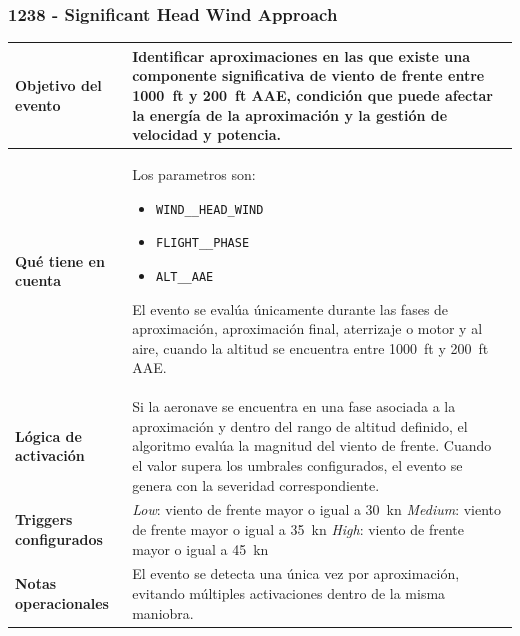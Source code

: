 \documentclass[11pt,a4paper]{article}
\begin{document}
	\subsubsection{1238 - Significant Head Wind Approach}
	\begin{table}[H]
		\centering
		\renewcommand{\arraystretch}{1.3}
		\begin{tabular}{p{5cm} p{9.5cm}}
			\hline
			\textbf{Objetivo del evento} &
			Identificar aproximaciones en las que existe una componente significativa de viento de frente entre \SI{1000}{ft} y \SI{200}{ft} AAE, condición que puede afectar la energía de la aproximación y la gestión de velocidad y potencia. \\
			\hline
			\textbf{Qué tiene en cuenta} & Los parametros son:
			\begin{itemize}
				\item \texttt{WIND\_\_HEAD\_WIND}
				\item \texttt{FLIGHT\_\_PHASE}
				\item \texttt{ALT\_\_AAE}
			\end{itemize}
			El evento se evalúa únicamente durante las fases de aproximación, aproximación final, aterrizaje o motor y al aire, cuando la altitud se encuentra entre \SI{1000}{ft} y \SI{200}{ft} AAE. \\
			\hline
			\textbf{Lógica de activación} &
			Si la aeronave se encuentra en una fase asociada a la aproximación y dentro del rango de altitud definido, el algoritmo evalúa la magnitud del viento de frente. Cuando el valor supera los umbrales configurados, el evento se genera con la severidad correspondiente. \\
			\hline
			\textbf{Triggers configurados} &
			\textit{Low}: viento de frente mayor o igual a \SI{30}{\knot} \newline
			\textit{Medium}: viento de frente mayor o igual a \SI{35}{\knot} \newline
			\textit{High}: viento de frente mayor o igual a \SI{45}{\knot} \\
			\hline
			\textbf{Notas operacionales} &
			El evento se detecta una única vez por aproximación, evitando múltiples activaciones dentro de la misma maniobra. \\
			\hline
		\end{tabular}
	\end{table}
\end{document}
